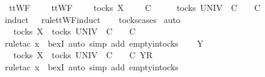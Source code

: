 \begin{isabellebody}
\ \ {\isachardoublequoteopen}ttWF\ {\isacharparenleft}{\isasymrho}{\isacharprime}\ {\isacharat}\ {\isasymsigma}{\isacharprime}{\isacharparenright}\ {\isasymLongrightarrow}\ ttWF\ {\isasymsigma}\ {\isasymLongrightarrow}\ {\isasymrho}{\isacharprime}\ {\isasymin}\ tocks\ X\ {\isasymand}\ {\isasymrho}{\isacharprime}\ {\isacharat}\ {\isasymsigma}{\isacharprime}\ {\isasymsubseteq}\isactrlsub C\ {\isasymsigma}\ {\isasymLongrightarrow}\ {\isasymexists}\ {\isasymrho}\ {\isasymin}\ tocks\ UNIV{\isachardot}\ {\isasymrho}{\isacharprime}\ {\isasymsubseteq}\isactrlsub C\ {\isasymrho}\ {\isasymand}\ {\isasymrho}\ {\isasymle}\isactrlsub C\ {\isasymsigma}{\isachardoublequoteclose}\isanewline
%
\isadelimproof
\ \ %
\endisadelimproof
%
\isatagproof
{}\isamarkupfalse%
\ {\isacharparenleft}induct\ {\isasymrho}{\isacharprime}\ {\isasymsigma}\ rule{\isacharcolon}ttWF{}{\isachardot}induct{\isacharparenright}\isanewline
\ \ \isamarkupfalse%
\ tocks{\isachardot}cases\isanewline
{}\isamarkupfalse%
\ auto\isanewline
\ \ \isamarkupfalse%
\ {\isachardoublequoteopen}{\isacharbrackleft}{\isacharbrackright}\ {\isasymin}\ tocks\ X\ {\isasymLongrightarrow}\ {\isasymexists}{\isasymrho}{\isasymin}tocks\ UNIV{\isachardot}\ {\isacharbrackleft}{\isacharbrackright}\ {\isasymsubseteq}\isactrlsub C\ {\isasymrho}\ {\isasymand}\ {\isasymrho}\ {\isasymle}\isactrlsub C\ {\isacharbrackleft}{\isacharbrackright}{\isachardoublequoteclose}\isanewline
\ \ \ \ \isamarkupfalse%
\ {\isacharparenleft}rule{\isacharunderscore}tac\ x{\isacharequal}{\isachardoublequoteopen}{\isacharbrackleft}{\isacharbrackright}{\isachardoublequoteclose}\ \ bexI{\isacharcomma}\ auto\ simp\ add{\isacharcolon}\ empty{\isacharunderscore}in{\isacharunderscore}tocks{\isacharparenright}\isanewline
{}\isamarkupfalse%
\isanewline
\ \ \isamarkupfalse%
\ Y\isanewline
\ \ \isamarkupfalse%
\ {\isachardoublequoteopen}{\isacharbrackleft}{\isacharbrackright}\ {\isasymin}\ tocks\ X\ {\isasymLongrightarrow}\ {\isasymexists}{\isasymrho}{\isasymin}tocks\ UNIV{\isachardot}\ {\isacharbrackleft}{\isacharbrackright}\ {\isasymsubseteq}\isactrlsub C\ {\isasymrho}\ {\isasymand}\ {\isasymrho}\ {\isasymle}\isactrlsub C\ {\isacharbrackleft}{\isacharbrackleft}Y{\isacharbrackright}\isactrlsub R{\isacharbrackright}{\isachardoublequoteclose}\isanewline
\ \ \ \ \isamarkupfalse%
\ {\isacharparenleft}rule{\isacharunderscore}tac\ x{\isacharequal}{\isachardoublequoteopen}{\isacharbrackleft}{\isacharbrackright}{\isachardoublequoteclose}\ \ bexI{\isacharcomma}\ auto\ simp\ add{\isacharcolon}\ empty{\isacharunderscore}in{\isacharunderscore}tocks{\isacharparenright}\isanewline

\end{isabellebody}
